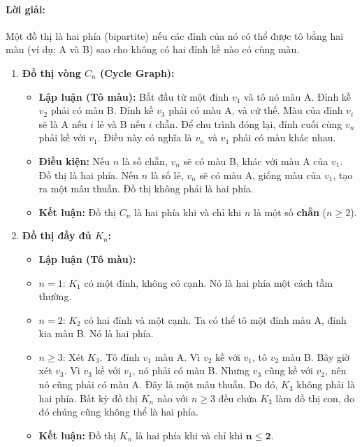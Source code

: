 \documentclass[a4paper,12pt]{article}
\begin{document}
\paragraph{Lời giải:}
Một đồ thị là hai phía (bipartite) nếu các đỉnh của nó có thể được tô bằng hai màu (ví dụ: A và B) sao cho không có hai đỉnh kề nào có cùng màu.

\begin{enumerate}
    \item \textbf{Đồ thị vòng $C_n$ (Cycle Graph):}
    \begin{itemize}
        \item \textbf{Lập luận (Tô màu):} Bắt đầu từ một đỉnh $v_1$ và tô nó màu A. Đỉnh kề $v_2$ phải có màu B. Đỉnh kề $v_3$ phải có màu A, và cứ thế. Màu của đỉnh $v_i$ sẽ là A nếu $i$ lẻ và B nếu $i$ chẵn. Để chu trình đóng lại, đỉnh cuối cùng $v_n$ phải kề với $v_1$. Điều này có nghĩa là $v_n$ và $v_1$ phải có màu khác nhau.
        \item \textbf{Điều kiện:} Nếu $n$ là số chẵn, $v_n$ sẽ có màu B, khác với màu A của $v_1$. Đồ thị là hai phía. Nếu $n$ là số lẻ, $v_n$ sẽ có màu A, giống màu của $v_1$, tạo ra một mâu thuẫn. Đồ thị không phải là hai phía.
        \item \textbf{Kết luận:} Đồ thị $C_n$ là hai phía khi và chỉ khi $n$ là một số \textbf{chẵn} ($n \ge 2$).
    \end{itemize}

    \item \textbf{Đồ thị đầy đủ $K_n$:}
    \begin{itemize}
        \item \textbf{Lập luận (Tô màu):}
            \item $n=1$: $K_1$ có một đỉnh, không có cạnh. Nó là hai phía một cách tầm thường.
            \item $n=2$: $K_2$ có hai đỉnh và một cạnh. Ta có thể tô một đỉnh màu A, đỉnh kia màu B. Nó là hai phía.
            \item $n \ge 3$: Xét $K_3$. Tô đỉnh $v_1$ màu A. Vì $v_2$ kề với $v_1$, tô $v_2$ màu B. Bây giờ xét $v_3$. Vì $v_3$ kề với $v_1$, nó phải có màu B. Nhưng $v_3$ cũng kề với $v_2$, nên nó cũng phải có màu A. Đây là một mâu thuẫn. Do đó, $K_3$ không phải là hai phía. Bất kỳ đồ thị $K_n$ nào với $n \ge 3$ đều chứa $K_3$ làm đồ thị con, do đó chúng cũng không thể là hai phía.
        \item \textbf{Kết luận:} Đồ thị $K_n$ là hai phía khi và chỉ khi $\mathbf{n \le 2}$.
    \end{itemize}
\end{enumerate}
\end{document}
